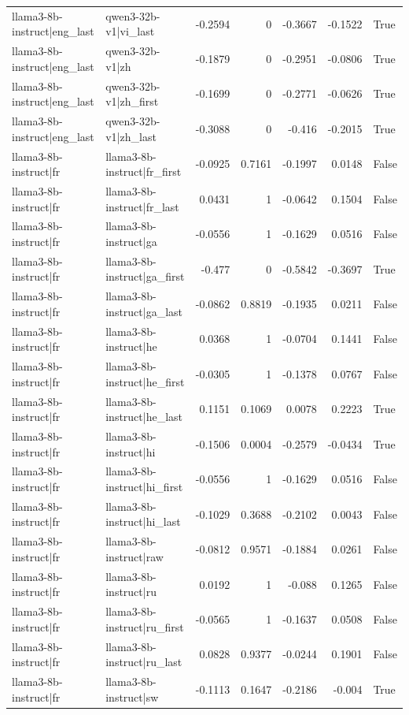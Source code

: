 \begin{table}
\begin{tabular}{l l r r r r l}
llama3-8b-instruct|eng_last & qwen3-32b-v1|vi_last & -0.2594 & 0 & -0.3667 & -0.1522 & True \\
llama3-8b-instruct|eng_last & qwen3-32b-v1|zh & -0.1879 & 0 & -0.2951 & -0.0806 & True \\
llama3-8b-instruct|eng_last & qwen3-32b-v1|zh_first & -0.1699 & 0 & -0.2771 & -0.0626 & True \\
llama3-8b-instruct|eng_last & qwen3-32b-v1|zh_last & -0.3088 & 0 & -0.416 & -0.2015 & True \\
llama3-8b-instruct|fr & llama3-8b-instruct|fr_first & -0.0925 & 0.7161 & -0.1997 & 0.0148 & False \\
llama3-8b-instruct|fr & llama3-8b-instruct|fr_last & 0.0431 & 1 & -0.0642 & 0.1504 & False \\
llama3-8b-instruct|fr & llama3-8b-instruct|ga & -0.0556 & 1 & -0.1629 & 0.0516 & False \\
llama3-8b-instruct|fr & llama3-8b-instruct|ga_first & -0.477 & 0 & -0.5842 & -0.3697 & True \\
llama3-8b-instruct|fr & llama3-8b-instruct|ga_last & -0.0862 & 0.8819 & -0.1935 & 0.0211 & False \\
llama3-8b-instruct|fr & llama3-8b-instruct|he & 0.0368 & 1 & -0.0704 & 0.1441 & False \\
llama3-8b-instruct|fr & llama3-8b-instruct|he_first & -0.0305 & 1 & -0.1378 & 0.0767 & False \\
llama3-8b-instruct|fr & llama3-8b-instruct|he_last & 0.1151 & 0.1069 & 0.0078 & 0.2223 & True \\
llama3-8b-instruct|fr & llama3-8b-instruct|hi & -0.1506 & 0.0004 & -0.2579 & -0.0434 & True \\
llama3-8b-instruct|fr & llama3-8b-instruct|hi_first & -0.0556 & 1 & -0.1629 & 0.0516 & False \\
llama3-8b-instruct|fr & llama3-8b-instruct|hi_last & -0.1029 & 0.3688 & -0.2102 & 0.0043 & False \\
llama3-8b-instruct|fr & llama3-8b-instruct|raw & -0.0812 & 0.9571 & -0.1884 & 0.0261 & False \\
llama3-8b-instruct|fr & llama3-8b-instruct|ru & 0.0192 & 1 & -0.088 & 0.1265 & False \\
llama3-8b-instruct|fr & llama3-8b-instruct|ru_first & -0.0565 & 1 & -0.1637 & 0.0508 & False \\
llama3-8b-instruct|fr & llama3-8b-instruct|ru_last & 0.0828 & 0.9377 & -0.0244 & 0.1901 & False \\
llama3-8b-instruct|fr & llama3-8b-instruct|sw & -0.1113 & 0.1647 & -0.2186 & -0.004 & True \\

\end{tabular}
\end{table}
